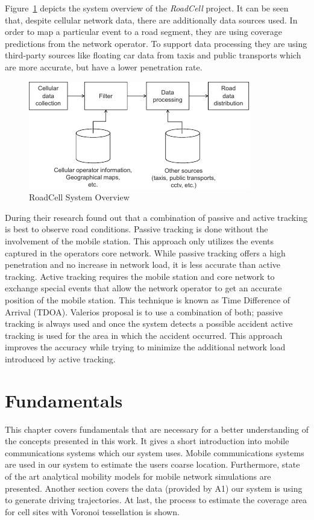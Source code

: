 \documentclass[master,english]{hgbthesis}
\begin{document}
Figure~\ref{fig:roadcell} depicts the system overview of the \emph{RoadCell} project. It can be seen that, despite cellular network data, there are additionally data sources used. In order to map a particular event to a road segment, they are using coverage predictions from the network operator. To support data processing they are using third-party sources like floating car data from taxis and public transports which are more accurate, but have a lower penetration rate.
\begin{figure}
\centering
\includegraphics[width=0.7\linewidth]{./images/roadcell}
\caption{RoadCell System Overview \cite{Valerio2009}}
\label{fig:roadcell}
\end{figure}
During their research found out that a combination of passive and active tracking is best to observe road conditions. Passive tracking is done without the involvement of the mobile station. This approach only utilizes the events captured in the operators core network. While passive tracking offers a high penetration and no increase in network load, it is less accurate than active tracking. Active tracking requires the mobile station and core network to exchange special events that allow the network operator to get an accurate position of the mobile station. This technique is known as Time Difference of Arrival (TDOA). Valerios proposal is to use a combination of both; passive tracking is always used and once the system detects a possible accident active tracking is used for the area in which the accident occurred. This approach improves the accuracy while trying to minimize the additional network load introduced by active tracking.
\chapter{Fundamentals}
\label{cha:fundamentals}
This chapter covers fundamentals that are necessary for a better understanding of the concepts presented in this work. It gives a short introduction into mobile communications systems which our system uses. Mobile communications systems are used in our system to estimate the users coarse location. Furthermore, state of the art analytical mobility models for mobile network simulations are presented. Another section covers the data (provided by A1) our system is using to generate driving trajectories. At last, the process to estimate the coverage area for cell sites with Voronoi tessellation is shown.
\end{document}
